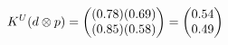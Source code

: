 \documentclass[preview]{standalone}
\begin{document}
\begin{align*}
\special{dvisvgm:raw <g id='unique000'>}K^U(d \otimes p) = \begin{pmatrix} (0.78)(0.69) \\ (0.85)(0.58) \end{pmatrix} = \begin{pmatrix} 0.54 \\ 0.49 \end{pmatrix}\special{dvisvgm:raw </g>}
\end{align*}
\end{document}

